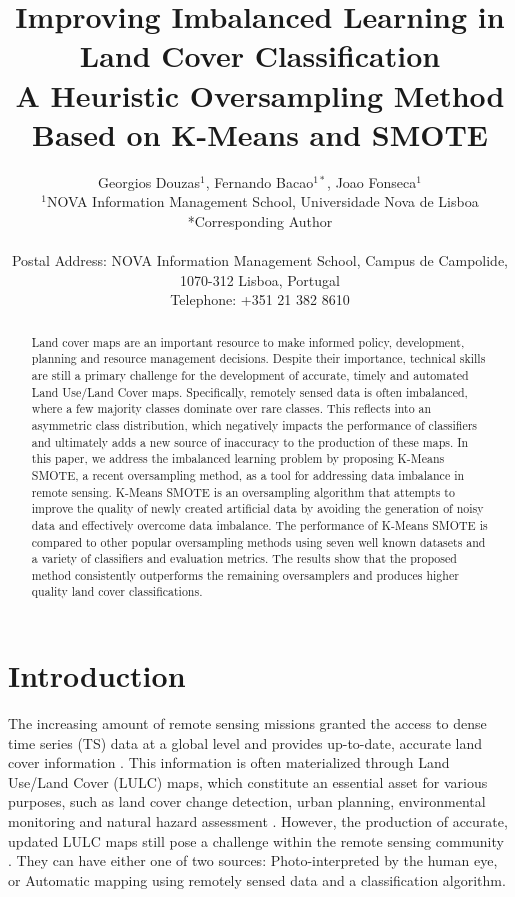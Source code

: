\documentclass[parskip=full]{scrartcl}
\title{Improving Imbalanced Learning in Land Cover Classification \\ 
	\LARGE{A Heuristic Oversampling Method Based on K-Means and SMOTE}}
\author{
	Georgios Douzas\(^{1}\), Fernando Bacao\(^{1*}\), Joao Fonseca\(^{1}\)
	\\
	\small{\(^{1}\)NOVA Information Management School, Universidade Nova de Lisboa}
	\\
	\small{*Corresponding Author}
	\\
	\\
	\small{Postal Address: NOVA Information Management School, Campus de Campolide, 1070-312 Lisboa, Portugal}
	\\
	\small{Telephone: +351 21 382 8610}
}
\date{}
\begin{document}
\maketitle

\begin{abstract}

    Land cover maps are an important resource to make informed policy, development, planning and
    resource management decisions. Despite their importance, technical skills are still a primary
    challenge for the development of accurate, timely and automated Land Use/Land Cover maps.
    Specifically, remotely sensed data is often imbalanced, where a few majority classes dominate
    over rare classes. This reflects into an asymmetric class distribution, which negatively impacts
    the performance of classifiers and ultimately adds a new source of inaccuracy to the production
    of these maps. In this paper, we address the imbalanced learning problem by proposing K-Means
    SMOTE, a recent oversampling method, as a tool for addressing data imbalance in remote sensing.
    K-Means SMOTE is an oversampling algorithm that attempts to improve the quality of newly created
    artificial data by avoiding the generation of noisy data and effectively overcome data
    imbalance. The performance of K-Means SMOTE is compared to other popular oversampling methods
    using seven well known datasets and a variety of classifiers and evaluation metrics. The results
    show that the proposed method consistently outperforms the remaining oversamplers and produces
    higher quality land cover classifications.

\end{abstract}

\section{Introduction}


The increasing amount of remote sensing missions granted the access to dense
time series (TS) data at a global level and provides up-to-date, accurate land
cover information \cite{Drusch2012}. This information is often
materialized through Land Use/Land Cover (LULC) maps, which constitute an
essential asset for various purposes, such as land cover change detection,
urban planning, environmental monitoring and natural hazard assessment
\cite{Khatami2016}. However, the production of accurate, updated LULC maps
still pose a challenge within the remote sensing community
\cite{Wulder2018}. They can have either one of two sources:
Photo-interpreted by the human eye, or Automatic mapping using remotely sensed
data and a classification algorithm.
\end{document}
